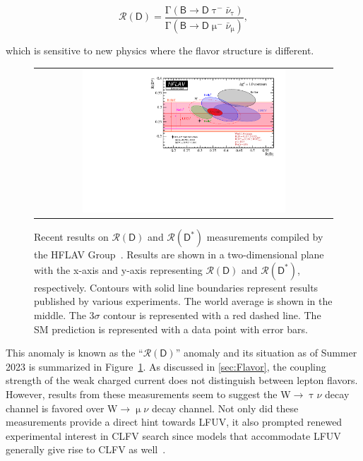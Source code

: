 \begin{equation}
\mathcal{R}(\textsf{D})=\frac{\mathrm{\Gamma}(\textsf{B}\rightarrow\textsf{D}\uptau^{-}\bar{\nu}_{\uptau})}{\mathrm{\Gamma}(\textsf{B}\rightarrow\textsf{D}\upmu^{-}\bar{\nu}_{\upmu})},
\end{equation}

which is sensitive to new physics where the flavor structure is different.

\begin{figure}[tbh!]
 \begin{center}
 \begin{tabular}{c}
 \includegraphics[width=0.7\textwidth]{figures/Part1/BSM/RD}
 \end{tabular}
 \caption{Recent results on $\mathcal{R}(\textsf{D})$ and $\mathcal{R}(\textsf{D}^{*})$ measurements compiled by the HFLAV Group~\cite{HFLAV}. Results are shown in a two-dimensional plane with the x-axis and y-axis representing $\mathcal{R}(\textsf{D})$ and $\mathcal{R}(\textsf{D}^{*})$, respectively. Contours with solid line boundaries represent results published by various experiments. The world average is shown in the middle. The 3$\sigma$ contour is represented with a red dashed line. The \ac{SM} prediction is represented with a data point with error bars.}
 \label{fig:RD}
 \end{center}
\end{figure}

This anomaly is known as the ``$\mathcal{R}(\textsf{D})$'' anomaly and its situation as of Summer 2023 is summarized in Figure~\ref{fig:RD}. As discussed in \autoref{sec:Flavor}, the coupling strength of the weak charged current does not distinguish between lepton flavors. However, results from these measurements seem to suggest the W$\rightarrow\uptau\nu$ decay channel is favored over W$\rightarrow\upmu\nu$ decay channel. Not only did these measurements provide a direct hint towards \ac{LFUV}, it also prompted renewed experimental interest in \ac{CLFV} search since models that accommodate \ac{LFUV} generally give rise to \ac{CLFV} as well~\cite{Glashow:2014iga}. 

